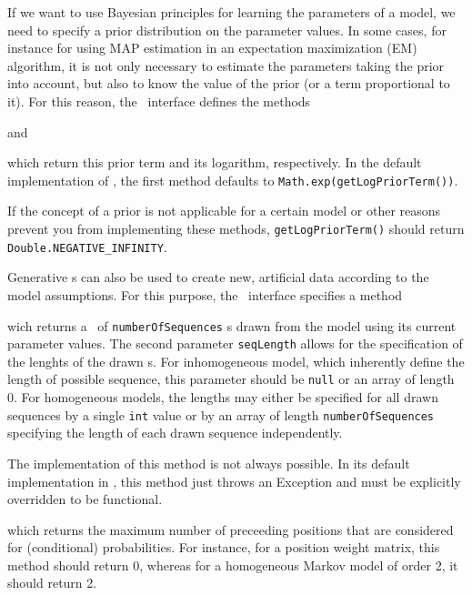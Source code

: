 If we want to use Bayesian principles for learning the parameters of a model, we need to specify a prior distribution on the parameter values. In some cases, for instance for using MAP estimation in an expectation maximization (EM) algorithm, it is not only necessary to estimate the parameters taking the prior into account, but also to know the value of the prior (or a term proportional to it). For this reason, the \TrainSM~interface defines the methods
\addtocounter{off}{11}
and
\addtocounter{off}{13}
which return this prior term and its logarithm, respectively. In the default implementation of \AbstractTrainSM, the first method defaults to \lstinline+Math.exp(getLogPriorTerm())+.

If the concept of a prior is not applicable for a certain model or other reasons prevent you from implementing these methods, \lstinline+getLogPriorTerm()+ should return \lstinline+Double.NEGATIVE_INFINITY+.

Generative \TrainSM s can also be used to create new, artificial data according to the model assumptions. For this purpose, the \TrainSM~interface specifies a method
\addtocounter{off}{50}
wich returns a \DataSet~of \lstinline+numberOfSequences+ \Sequence s drawn from the model using its current parameter values. The second parameter \lstinline+seqLength+ allows for the specification of the lenghts of the drawn \Sequence s. For inhomogeneous model, which inherently define the length of possible sequence, this parameter should be \lstinline+null+ or an array of length 0. For homogeneous models, the lengths may either be specified for all drawn sequences by a single \lstinline+int+ value or by an array of length \lstinline+numberOfSequences+ specifying the length of each drawn sequence independently.

The implementation of this method is not always possible. In its default implementation in \AbstractTrainSM, this method just throws an Exception and must be explicitly overridden to be functional.






\addtocounter{off}{10}
which returns the maximum number of preceeding positions that are considered for (conditional) probabilities.
For instance, for a position weight matrix, this method should return 0, whereas for a homogeneous Markov model of order 2, it should return 2.




\subsubsection{\TrainSM}

